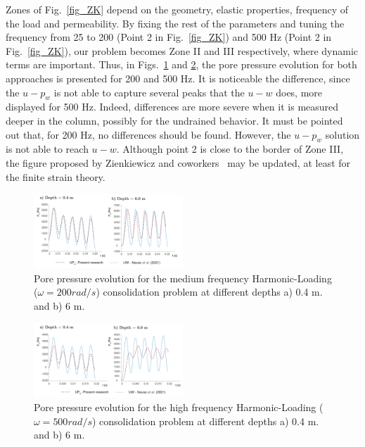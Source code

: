 \documentclass[twocolumn]{svjour3}          %
\begin{document}
Zones of Fig.~\ref{fig_ZK} depend on the geometry, elastic properties, frequency of the load and permeability.  By fixing the rest of the parameters and tuning the frequency from 25 to 200 (Point 2 in Fig.~\ref{fig_ZK}) and 500 Hz (Point 2 in Fig.~\ref{fig_ZK}), our problem becomes Zone II and III respectively, where dynamic terms are important. Thus, in Figs.~\ref{fig_con4} and \ref{fig_con5}, the pore pressure evolution for both approaches is presented for 200 and 500 Hz. It is noticeable the difference, since the $u-p_w$ is not able to capture several peaks that the $u-w$ does, more displayed for 500 Hz. Indeed, differences are more severe when it is measured deeper in the column, possibly for the undrained behavior. It must be pointed out that, for 200 Hz, no differences should be found. However, the $u-p_w$ solution is not able to reach $u-w$. Although point 2 is close to the border of Zone III, the figure proposed by Zienkiewicz and coworkers~\cite{zienkiewicz1990a} may be updated, at least for the finite strain theory.

\begin{figure}
\begin{center}
\includegraphics[width=0.5\textwidth]{Fig/fig_MF.pdf}
\caption{Pore pressure evolution for the medium frequency Harmonic-Loading ($\omega=200 rad/s$) consolidation problem at different depths a) 0.4 m. and b) 6 m.}
\label{fig_con4}
\end{center}
\end{figure}

\begin{figure}
\begin{center}
\includegraphics[width=0.5\textwidth]{Fig/fig_HF.pdf}
\caption{Pore pressure evolution for the high frequency Harmonic-Loading ($\omega=500 rad/s$) consolidation problem at different depths a) 0.4 m. and b) 6 m.}
\label{fig_con5}
\end{center}
\end{figure}
\end{document}

